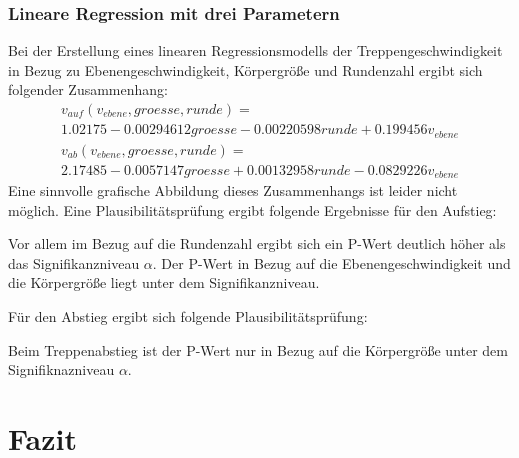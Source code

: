	
	
	
	
	
	
	
	
	\subsubsection{Lineare Regression mit drei Parametern}
	Bei der Erstellung eines linearen Regressionsmodells der Treppengeschwindigkeit in Bezug zu Ebenengeschwindigkeit, Körpergröße und Rundenzahl ergibt sich folgender Zusammenhang:
	\begin{multline}
		v_{auf}(v_{ebene}, groesse, runde) = \\ 
		1.02175 -0.00294612 groesse -0.00220598 runde +0.199456 v_{ebene}
	\end{multline}
	\begin{multline}
		v_{ab}(v_{ebene}, groesse, runde ) = \\ 
		2.17485 -0.0057147 groesse+0.00132958 runde -0.0829226 v_{ebene}
	\end{multline}
	Eine sinnvolle grafische Abbildung dieses Zusammenhangs ist leider nicht möglich. 
	Eine Plausibilitätsprüfung ergibt folgende Ergebnisse für den Aufstieg:
	
	Vor allem im Bezug auf die Rundenzahl ergibt sich ein P-Wert deutlich höher als das Signifikanzniveau $\alpha$. Der P-Wert in Bezug auf die Ebenengeschwindigkeit und die Körpergröße liegt unter dem Signifikanzniveau.
	
	
	Für den Abstieg ergibt sich folgende Plausibilitätsprüfung:
	
	Beim Treppenabstieg ist der P-Wert nur in Bezug auf die Körpergröße unter dem Signifiknazniveau $\alpha$.
	
	
	\section{Fazit}
	

